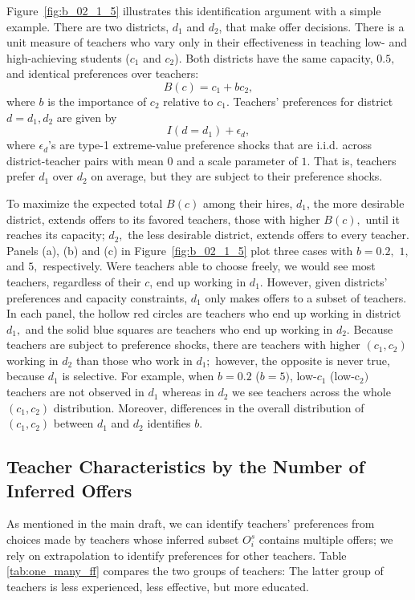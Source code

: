 \documentclass[notitlepage,12pt]{article}%
\begin{document}
Figure~\ref{fig:b_02_1_5} illustrates this identification argument with a
simple example. There are two districts, $d_{1}$ and $d_{2}$, that make offer
decisions. There is a unit measure of teachers who vary only in their
effectiveness in teaching low- and high-achieving students ($c_{1}$ and
$c_{2}$). Both districts have the same capacity, $0.5,$ and identical
preferences over teachers:
\[
B\left(  c\right)  =c_{1}+bc_{2},
\]
where $b$ is the importance of $c_{2}$ relative to $c_{1}.$ Teachers'
preferences for district $d=d_{1},d_{2}$ are given by
\[
I\left(  d=d_{1}\right)  +\epsilon_{d},
\]
where $\epsilon_{d}$'s are type-1 extreme-value preference shocks that are
i.i.d. across district-teacher pairs with mean $0$ and a scale parameter of
$1$. That is, teachers prefer $d_{1}$ over $d_{2}$ on average, but they are
subject to their preference shocks.

To maximize the expected total $B\left(  c\right)  $ among their hires,
$d_{1}$, the more desirable district, extends offers to its favored teachers,
those with higher $B\left(  c\right)  ,$ until it reaches its capacity;
$d_{2},$ the less desirable district, extends offers to every teacher. Panels
(a), (b) and (c) in Figure~\ref{fig:b_02_1_5} plot three cases with $b=0.2,$
$1,$ and $5,$ respectively. Were teachers able to choose freely, we would see
most teachers, regardless of their $c$, end up working in $d_{1}.$ However,
given districts' preferences and capacity constraints, $d_{1}$ only makes
offers to a subset of teachers. In each panel, the hollow red circles are
teachers who end up working in district $d_{1},$ and the solid blue squares
are teachers who end up working in $d_{2}.$ Because teachers are subject to
preference shocks, there are teachers with higher $\left(  c_{1},c_{2}\right)
$ working in $d_{2}$ than those who work in $d_{1};$ however, the opposite is
never true, because $d_{1}$ is selective. For example, when $b=0.2$ ($b=5)$,
low-$c_{1}$ (low-c$_{2})$ teachers are not observed in $d_{1}$ whereas in
$d_{2}$ we see teachers across the whole $\left(  c_{1},c_{2}\right)  $
distribution. Moreover, differences in the overall distribution of $\left(
c_{1},c_{2}\right)  $ between $d_{1}$ and $d_{2}$ identifies $b.$

\subsection{Teacher Characteristics by the Number of Inferred Offers}

As mentioned in the main draft, we can identify teachers' preferences from choices made by teachers whose inferred subset $O_{i}^{s}$ contains multiple offers; we rely on extrapolation to identify preferences for other teachers. Table \ref{tab:one_many_ff} compares the two groups of teachers: The latter group of teachers is less experienced, less effective, but more educated. 
\end{document}
